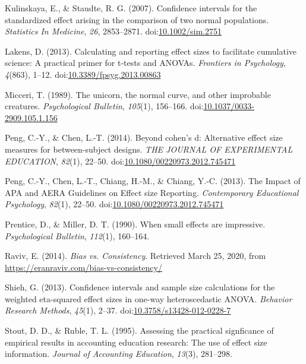 \documentclass[
  man,floatsintext]{apa6}
\begin{document}
\leavevmode\hypertarget{ref-Kulinskaya_Staudte_2007}{}%
Kulinskaya, E., \& Staudte, R. G. (2007). Confidence intervals for the standardized effect arising in the comparison of two normal populations. \emph{Statistics In Medicine}, \emph{26}, 2853--2871. doi:\href{https://doi.org/10.1002/sim.2751}{10.1002/sim.2751}

\leavevmode\hypertarget{ref-Lakens_2013}{}%
Lakens, D. (2013). Calculating and reporting effect sizes to facilitate cumulative science: A practical primer for t-tests and ANOVAs. \emph{Frontiers in Psychology}, \emph{4}(863), 1--12. doi:\href{https://doi.org/10.3389/fpsyg.2013.00863}{10.3389/fpsyg.2013.00863}

\leavevmode\hypertarget{ref-Micceri_1989}{}%
Micceri, T. (1989). The unicorn, the normal curve, and other improbable creatures. \emph{Psychological Bulletin}, \emph{105}(1), 156--166. doi:\href{https://doi.org/10.1037/0033-2909.105.1.156}{10.1037/0033-2909.105.1.156}

\leavevmode\hypertarget{ref-Peng_and_Chen_2014}{}%
Peng, C.-Y., \& Chen, L.-T. (2014). Beyond cohen's d: Alternative effect size measures for between-subject designs. \emph{THE JOURNAL OF EXPERIMENTAL EDUCATION}, \emph{82}(1), 22--50. doi:\href{https://doi.org/10.1080/00220973.2012.745471}{10.1080/00220973.2012.745471}

\leavevmode\hypertarget{ref-Peng_et_al_2013}{}%
Peng, C.-Y., Chen, L.-T., Chiang, H.-M., \& Chiang, Y.-C. (2013). The Impact of APA and AERA Guidelines on Effect size Reporting. \emph{Contemporary Educational Psychology}, \emph{82}(1), 22--50. doi:\href{https://doi.org/10.1080/00220973.2012.745471}{10.1080/00220973.2012.745471}

\leavevmode\hypertarget{ref-Prentice_Miller_1992}{}%
Prentice, D., \& Miller, D. T. (1990). When small effects are impressive. \emph{Psychological Bulletin}, \emph{112}(1), 160--164.

\leavevmode\hypertarget{ref-Raviv}{}%
Raviv, E. (2014). \emph{Bias vs. Consistency}. Retrieved March 25, 2020, from \url{https://eranraviv.com/bias-vs-consistency/}

\leavevmode\hypertarget{ref-Shieh_2013}{}%
Shieh, G. (2013). Confidence intervals and sample size calculations for the weighted eta-squared effect sizes in one-way heteroscedastic ANOVA. \emph{Behavior Research Methods}, \emph{45}(1), 2--37. doi:\href{https://doi.org/10.3758/s13428-012-0228-7}{10.3758/s13428-012-0228-7}

\leavevmode\hypertarget{ref-Stout_Ruble_1995}{}%
Stout, D. D., \& Ruble, T. L. (1995). Assessing the practical signficance of empirical results in accounting education research: The use of effect size information. \emph{Journal of Accounting Education}, \emph{13}(3), 281--298.
\end{document}
